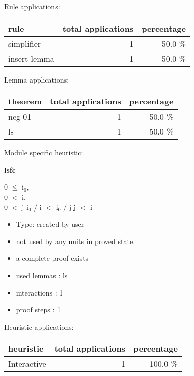 \documentclass[a4paper]{article}
\begin{document}
Rule applications:

\begin{supertabular}{l|r|r}
rule	        & total applications & percentage \\ \hline
simplifier & 1 & 50.0 \% \\
insert lemma & 1 & 50.0 \% \\

\end{supertabular}

Lemma applications:

\begin{supertabular}{l|r|r}
theorem	        & total applications & percentage \\ \hline
neg-01 & 1 & 50.0 \% \\
ls & 1 & 50.0 \% \\

\end{supertabular}

Module specific heuristic:

\pagebreak

{\LARGE\bf lsfc}\label{lemma-lsfc}

\medskip

0 $\le$ $\mbox{i}_{0}$, \\
0 $<$ i, \\
0 $<$ j \Fol $\mbox{i}_{0}$ / i $<$ $\mbox{i}_{0}$ / j \Imp j $<$ i

\begin{itemize}

\item Type: created by user

\item not used by any units in proved state.
\item       a complete proof exists
\item       used lemmas  : ls
\item       interactions : 1
\item       proof steps  : 1
\end{itemize}

\medskip


Heuristic applications:

\begin{supertabular}{l|r|r}
heuristic	& total applications & percentage \\ \hline
Interactive & 1 & 100.0 \% \\

\end{supertabular}
\end{document}
